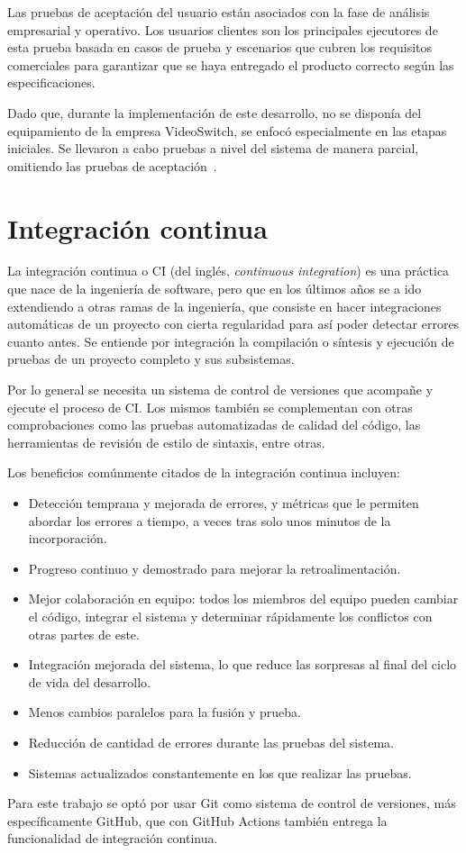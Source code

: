   Las pruebas de aceptación del usuario están asociados con la fase de
  análisis empresarial y operativo. Los usuarios clientes son los principales
  ejecutores de esta prueba basada en casos de prueba y escenarios que cubren los
  requisitos comerciales para garantizar que se haya entregado el producto correcto
  según las especificaciones.

  Dado que, durante la implementación de este desarrollo, no se disponía del
  equipamiento de la empresa VideoSwitch, se enfocó especialmente en las etapas
  iniciales. Se llevaron a cabo pruebas a nivel del sistema de manera parcial,
  omitiendo las pruebas de aceptación~\citep{testbench}.


\section{Integración continua}

La integración continua o CI (del inglés, \textit{continuous integration}) es una
práctica que nace de la ingeniería de software, pero que en los últimos años se
a ido extendiendo a otras ramas de la ingeniería, que consiste en hacer
integraciones automáticas de un proyecto con cierta regularidad para así poder
detectar errores cuanto antes. Se entiende por integración la compilación o
síntesis y ejecución de pruebas de un proyecto completo y sus subsistemas. 

Por lo general se necesita un sistema de control de versiones que acompañe y
ejecute el proceso de CI\@. Los mismos también se complementan con otras
comprobaciones como las pruebas automatizadas de calidad del código, las
herramientas de revisión de estilo de sintaxis, entre otras.

Los beneficios comúnmente citados de la integración continua incluyen:
\begin{itemize}
  \item Detección temprana y mejorada de errores, y métricas que le permiten
  abordar los errores a tiempo, a veces tras solo unos minutos de la incorporación.
  \item Progreso continuo y demostrado para mejorar la retroalimentación.
  \item Mejor colaboración en equipo: todos los miembros del equipo pueden 
  cambiar el código, integrar el sistema y determinar rápidamente los conflictos
  con otras partes de este.
  \item Integración mejorada del sistema, lo que reduce las sorpresas al final
  del ciclo de vida del desarrollo.
  \item Menos cambios paralelos para la fusión y prueba.
  \item Reducción de cantidad de errores durante las pruebas del sistema.
  \item Sistemas actualizados constantemente en los que realizar las pruebas.
\end{itemize}

Para este trabajo se optó por usar Git como sistema de control de
versiones, más específicamente GitHub, que con GitHub Actions también entrega
la funcionalidad de integración continua.